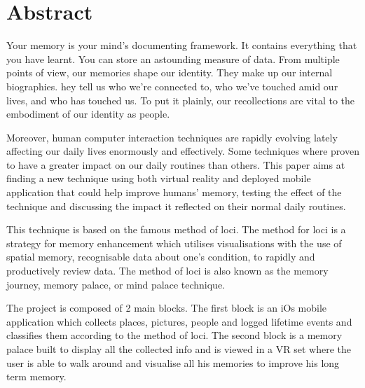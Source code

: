 \chapter*{Abstract}
\label{chap:abstract}

    Your memory is your mind's documenting framework. It contains everything that you have learnt. You can store an astounding measure of data. From multiple points of view, our memories shape our identity. They make up our internal biographies. hey tell us who we're connected to, who we've touched amid our lives, and who has touched us. To put it plainly, our recollections are vital to the embodiment of our identity as people. 


	Moreover, human computer interaction techniques are rapidly evolving lately affecting our daily lives enormously and effectively. Some techniques where proven to have a greater impact on our daily routines than others. This paper aims at finding a new technique using both virtual reality and deployed mobile application that could help improve humans’ memory, testing the effect of the technique and discussing the impact it reflected on their normal daily routines.


	This technique is based on the famous method of loci. The method for loci is a strategy for memory enhancement which utilises visualisations with the use of spatial memory, recognisable data about one's condition, to rapidly and productively review data. The method of loci is also known as the memory journey, memory palace, or mind palace technique.


	The project is composed of 2 main blocks. The first block is an iOs mobile application which collects places, pictures, people and logged lifetime events and classifies them according to the method of loci. The second block is a memory palace built to display all the collected info and is viewed in a VR set where the user is able to walk around and visualise all his memories to improve his long term memory.

